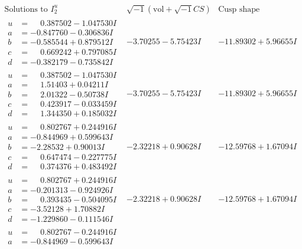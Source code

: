 \documentclass[1p]{elsarticle_modified}
\theoremstyle{definition}
\newcommand{\I}{\sqrt{-1}}
\begin{document}
$$\begin{array}{c|c|c}
 \end{array}$$\newpage$$\begin{array}{c|c|c}  
\text{Solutions to }I^u_{2}& \I (\text{vol} + \sqrt{-1}CS) & \text{Cusp shape}\\
 \hline 
\begin{aligned}
u &= \phantom{-}0.387502 - 1.047530 I \\
a &= -0.847760 - 0.306836 I \\
b &= -0.585544 + 0.879512 I \\
c &= \phantom{-}0.669242 + 0.797085 I \\
d &= -0.382179 - 0.735842 I\end{aligned}
 & -3.70255 - 5.75423 I & -11.89302 + 5.96655 I \\ \hline\begin{aligned}
u &= \phantom{-}0.387502 - 1.047530 I \\
a &= \phantom{-}1.51403 + 0.04211 I \\
b &= \phantom{-}2.01322 - 0.50738 I \\
c &= \phantom{-}0.423917 - 0.033459 I \\
d &= \phantom{-}1.344350 + 0.185032 I\end{aligned}
 & -3.70255 - 5.75423 I & -11.89302 + 5.96655 I \\ \hline\begin{aligned}
u &= \phantom{-}0.802767 + 0.244916 I \\
a &= -0.844969 + 0.599643 I \\
b &= -2.28532 + 0.90013 I \\
c &= \phantom{-}0.647474 - 0.227775 I \\
d &= \phantom{-}0.374376 + 0.483492 I\end{aligned}
 & -2.32218 + 0.90628 I & -12.59768 + 1.67094 I \\ \hline\begin{aligned}
u &= \phantom{-}0.802767 + 0.244916 I \\
a &= -0.201313 - 0.924926 I \\
b &= \phantom{-}0.393435 - 0.504095 I \\
c &= -3.52128 + 1.70882 I \\
d &= -1.229860 - 0.111546 I\end{aligned}
 & -2.32218 + 0.90628 I & -12.59768 + 1.67094 I \\ \hline\begin{aligned}
u &= \phantom{-}0.802767 - 0.244916 I \\
a &= -0.844969 - 0.599643 I \\

\end{aligned}
\end{array}$$
\end{document}
